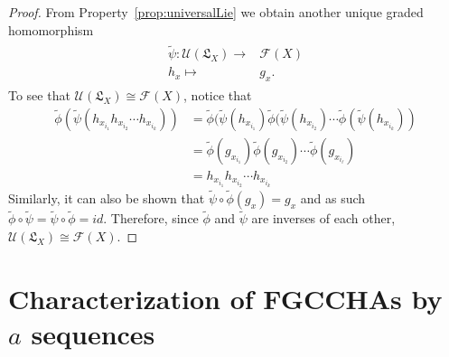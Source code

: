 \documentclass[11pt]{amsart}
\theoremstyle{definition}
\numberwithin{equation}{section}
\begin{document}
\begin{proof}
    From Property~\ref{prop:universalLie} we obtain another unique graded homomorphism 
    \begin{align*}
        \begin{array}{rcl}
            \tilde{\psi}: \mathcal{U}(\mathfrak{L}_{X}) \longrightarrow & \mathcal{F} (X) \\
            h_x \longmapsto & g_x.
        \end{array}
    \end{align*}
    To see that \(\mathcal{U}(\mathfrak{L}_{X}) \cong \mathcal{F}(X)\), notice that
    \begin{align*}
        \tilde{\phi}(\tilde{\psi}(h_{x_{i_{1}} }h_{x_{i_{2}}} \cdots h_{x_{i_{k}}}))  
        &= \tilde{\phi}(\tilde{\psi}(h_{x_{i_{1}} })\tilde{\phi}(\tilde{\psi}(h_{x_{i_{2}} } )\cdots \tilde{\phi}(\tilde{\psi}(h_{x_{i_{k}} })) \\
        &=  \tilde{\phi}(g_{x_{i_{1}} })\tilde{\phi}(g_{x_{i_{2}} })\cdots \tilde{\phi}(g_{x_{i_{\ell}} })\\
        &= h_{x_{i_{1}} }h_{x_{i_{2}} } \cdots h_{x_{i_{k}} }
    \end{align*} 
    Similarly, it can also be shown that \(\tilde{\psi} \circ \tilde{\phi} (g_x) = g_x\) and as such \(\tilde{\phi} \circ \tilde{\psi} = \tilde{\psi} \circ \tilde{\phi} = id\).
    Therefore, since \(\tilde{\phi}\) and \(\tilde{\psi}\) are inverses of each other,  \(\mathcal{U}(\mathfrak{L}_{X}) \cong \mathcal{F}(X)\).
\end{proof}

%

\section{Characterization of \textsf{FGCCHA}s by $a$ sequences}
\end{document}
